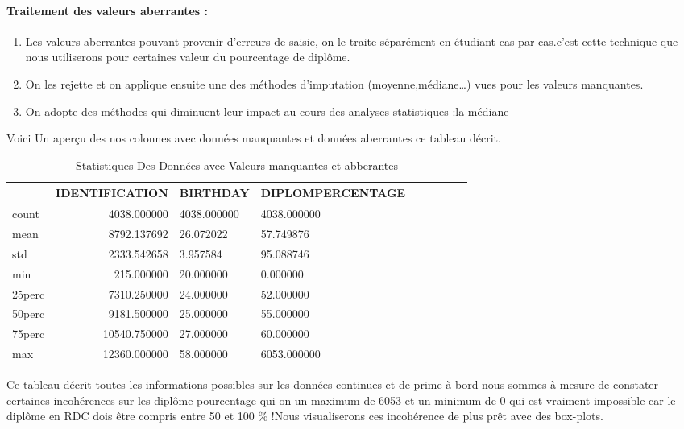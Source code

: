 \paragraph{Traitement des valeurs aberrantes :}
\begin{enumerate}
	\item  Les valeurs aberrantes pouvant provenir d'erreurs de saisie, on le traite séparément
	en étudiant cas par cas.c'est cette technique que nous utiliserons 
	pour certaines valeur du pourcentage de diplôme.
	\item On les rejette et on applique ensuite une des méthodes d’imputation (moyenne,médiane…) vues pour les valeurs manquantes.
	\item  On adopte des méthodes qui diminuent leur impact au cours des analyses statistiques :la médiane
\end{enumerate}
Voici Un aperçu des nos colonnes avec données manquantes et données aberrantes
ce tableau décrit.
\begin{table}
\centering
\begingroup %
\captionsetup{type=table} %
\caption{Statistiques Des Données avec Valeurs manquantes et abberantes}
\label{tab:MisisnV}
\begin{tabular}{lrlllllll}
	\toprule
	{}& IDENTIFICATION   &  BIRTHDAY &  DIPLOMPERCENTAGE \\
	\midrule  
count  &   4038.000000 & 4038.000000      & 4038.000000\\
mean   &   8792.137692  &   26.072022       &  57.749876 \\
std   &    2333.542658   &  3.957584     &    95.088746\\
min   &     215.000000    &20.000000     &     0.000000\\
25perc  &     7310.250000 &   24.000000     &    52.000000\\
50perc   &   9181.500000  & 25.000000      &   55.000000\\
75perc  &   10540.750000   & 27.000000     &    60.000000 \\
max  &    12360.000000  &  58.000000      & 6053.000000\\
\bottomrule
\end{tabular}
\endgroup
\end{table}

Ce tableau décrit toutes les informations possibles sur les données
continues et de prime à bord nous sommes à mesure de constater certaines
incohérences sur les diplôme pourcentage qui on un maximum de 6053 et un
minimum de 0 qui est vraiment impossible car le diplôme en RDC dois être
compris entre 50 et 100 \% !Nous visualiserons ces incohérence de
plus prêt avec des box-plots.

